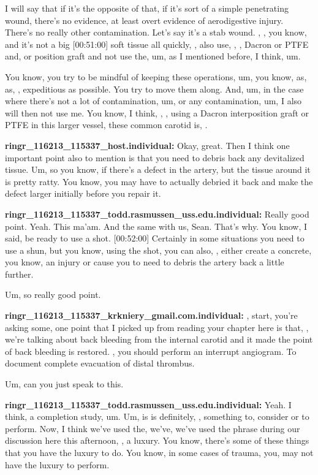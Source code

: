 \documentclass[
]{book}
\begin{document}
I will say that if it's the opposite of that, if it's sort of a simple
penetrating wound, there's no evidence, at least overt evidence of
aerodigestive injury. There's no really other contamination. Let's say
it's a stab wound. , , you know, and it's not a big {[}00:51:00{]} soft
tissue all quickly, , also use, , , Dacron or PTFE and, or position
graft and not use the, um, as I mentioned before, I think, um.

You know, you try to be mindful of keeping these operations, um, you
know, as, as, , expeditious as possible. You try to move them along.
And, um, in the case where there's not a lot of contamination, um, or
any contamination, um, I also will then not use me. You know, I think, ,
, using a Dacron interposition graft or PTFE in this larger vessel,
these common carotid is, .

\textbf{ringr\_116213\_115337\_host.individual:} Okay, great. Then I think one
important point also to mention is that you need to debris back any
devitalized tissue. Um, so you know, if there's a defect in the artery,
but the tissue around it is pretty ratty. You know, you may have to
actually debried it back and make the defect larger initially before you
repair it.

\textbf{ringr\_116213\_115337\_todd.rasmussen\_uss.edu.individual:} Really good
point. Yeah. This ma'am. And the same with us, Sean. That's why. You
know, I said, be ready to use a shot. {[}00:52:00{]} Certainly in some
situations you need to use a shun, but you know, using the shot, you can
also, , either create a concrete, you know, an injury or cause you to
need to debris the artery back a little further.

Um, so really good point.

\textbf{ringr\_116213\_115337\_krkniery\_gmail.com.individual:} , start, you're
asking some, one point that I picked up from reading your chapter here
is that, , we're talking about back bleeding from the internal carotid
and it made the point of back bleeding is restored. , you should perform
an interrupt angiogram. To document complete evacuation of distal
thrombus.

Um, can you just speak to this.

\textbf{ringr\_116213\_115337\_todd.rasmussen\_uss.edu.individual:} Yeah. I
think, a completion study, um. Um, is is definitely, , something to,
consider or to perform. Now, I think we've used the, we've, we've used
the phrase during our discussion here this afternoon, , a luxury. You
know, there's some of these things that you have the luxury to do. You
know, in some cases of trauma, you, may not have the luxury to perform.
\end{document}
